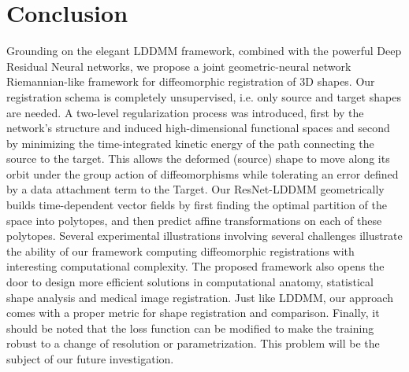 \section{Conclusion}
\label{sec:Conclusion} 
Grounding on the elegant LDDMM framework, combined with the powerful Deep Residual Neural networks, we propose a joint geometric-neural network Riemannian-like framework for diffeomorphic registration of 3D shapes. Our registration schema is completely unsupervised, i.e. only source and target shapes are needed. A two-level regularization process was introduced, first by the network's structure and induced high-dimensional functional spaces and second by minimizing the time-integrated kinetic energy of the path connecting the source to the target. This allows the deformed (source) shape to move along its orbit under the group action of diffeomorphisms while tolerating an error defined by a data attachment term to the Target. Our ResNet-LDDMM geometrically builds time-dependent vector fields by first finding the optimal partition of the space into polytopes, and then predict affine transformations on each of these polytopes. Several experimental illustrations involving several challenges illustrate the ability of our framework computing diffeomorphic registrations with interesting computational complexity. The proposed framework also opens the door to design more efficient solutions in computational anatomy, statistical shape analysis and medical image registration. Just like LDDMM, our approach comes with a proper metric for shape registration and comparison. Finally, it should be noted that the loss function can be modified to make the training robust to a change of resolution or parametrization. This problem will be the subject of our future investigation.